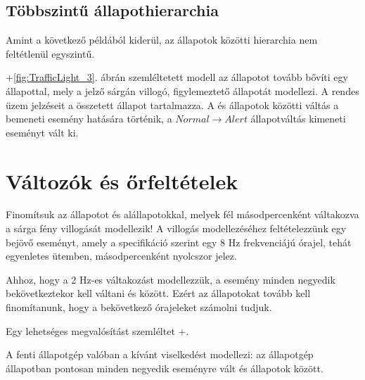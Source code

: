 \subsection{Többszintű állapothierarchia}

Amint a következő példából kiderül, az állapotok közötti hierarchia nem feltétlenül egyszintű.

\begin{pelda}
\Az+\ref{fig:TrafficLight_3}. ábrán szemléltetett modell az  állapotot tovább bővíti egy  állapottal, mely a jelző sárgán villogó, figylemeztető állapotát modellezi. A rendes üzem jelzéseit a  összetett állapot tartalmazza. A  és  állapotok közötti váltás a  bemeneti esemény hatására történik, a $\mathit{Normal} \rightarrow \mathit{Alert}$ állapotváltás  kimeneti eseményt vált ki.
\end{pelda}


\section{Változók és őrfeltételek}

Finomítsuk az  állapotot  és  alállapotokkal, melyek fél másodpercenként váltakozva a sárga fény villogását modellezik!
A villogás modellezéséhez feltételezzünk egy  bejövő eseményt, amely a specifikáció szerint egy 8 Hz frekvenciájú órajel, tehát egyenletes ütemben, másodpercenként nyolcszor jelez.

Ahhoz, hogy a 2 Hz-es váltakozást modellezzük, a  esemény minden negyedik bekövetkeztekor kell váltani  és  között. Ezért az állapotokat tovább kell finomítanunk, hogy a bekövetkező órajeleket számolni tudjuk.


Egy lehetséges megvalósítást szemléltet \az+.

A fenti állapotgép valóban a kívánt viselkedést modellezi: az állapotgép  állapotban pontosan minden negyedik  eseményre vált  és  állapotok között.

